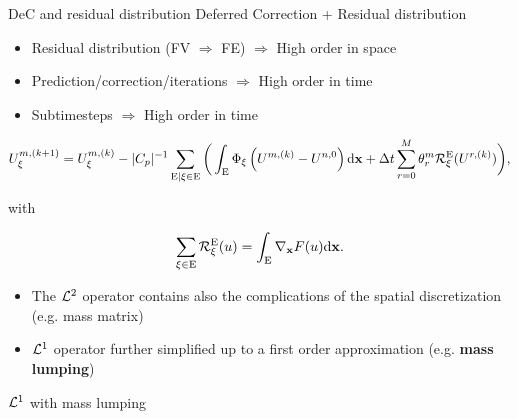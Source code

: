 \documentclass[9pt,compress,t,aspectratio=169]{beamer}
\begin{document}
\begin{frame}{DeC and residual distribution}
	Deferred Correction + Residual distribution
	\begin{itemize}
		\item Residual distribution (FV  $\Rightarrow$ FE) $\Rightarrow$ High order in space
		\item Prediction/correction/iterations $\Rightarrow$ High order in time
		\item Subtimesteps $\Rightarrow$ High order in time
	\end{itemize}
	\begin{equation*}\label{oneline}
		\begin{split}
			U^{m,(k+1)}_\xi = U_\xi^{m,(k)} -
			|C_p|^{-1} 
			\sum_{\mathrm{E}|\xi \in \mathrm{E}}\bigg(\int_{\mathrm{E}} \Phi_\xi \left(U^{m,(k)} - U^{n,0} \right) \mathrm{d} \mathbf{x} +\Delta t
			\sum_{r=0}^M \theta_{r}^m \mathcal{R}_\xi^{\mathrm{E}}(U^{r,(k)}) \bigg),
		\end{split}
	\end{equation*}
	\begin{center}
		with
	\end{center}
	\begin{equation*}\label{eq:L2RDspacetime}
		\sum_{\xi \in {\mathrm{E}}} {\mathcal{R}}^{{\mathrm{E}}}_\xi (u) = \int_{\mathrm{E}} \nabla_\mathbf{x}F(u)
		\mathrm{d} \mathbf{x}.
	\end{equation*}
\begin{itemize}
	\item The $\mathcal{L}^2$ operator contains also the complications of the spatial discretization (e.g. mass matrix)\vspace{2mm}
	\item $\mathcal{L}^1$ operator further simplified up to a first order approximation (e.g. \textbf{mass lumping}) 
\end{itemize}
\end{frame}

\begin{frame}{$\mathcal{L}^1$ with mass lumping}
	
\end{frame}
\end{document}

